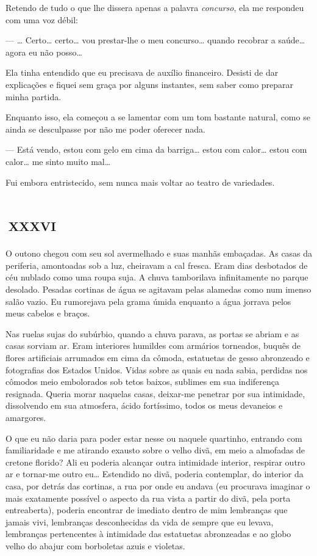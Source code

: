 Retendo de tudo o que lhe dissera apenas a palavra \textit{concurso}, ela me respondeu com uma voz débil:

--- \ldots{} Certo\ldots{} certo\ldots{} vou prestar-lhe o meu concurso\ldots{} quando recobrar a saúde\ldots{} agora eu não posso\ldots{}

Ela tinha entendido que eu precisava de auxílio financeiro. Desisti de dar explicações e fiquei sem graça por alguns instantes, sem saber como preparar minha partida.

Enquanto isso, ela começou a se lamentar com um tom bastante natural, como se ainda se desculpasse por não me poder oferecer nada.

--- Está vendo, estou com gelo em cima da barriga\ldots{} estou com calor\ldots{} estou com calor\ldots{} me sinto muito mal\ldots{}

Fui embora entristecido, sem nunca mais voltar ao teatro de variedades.


\chapter*{\small{}\,\Large\centering\textsc{xxxvi}\,\small{}}

O outono chegou com seu sol avermelhado e suas manhãs embaçadas. As casas da periferia, amontoadas sob a luz, cheiravam a cal fresca. Eram dias desbotados de céu nublado como uma roupa suja. A chuva tamborilava infinitamente no parque desolado. Pesadas cortinas de água se agitavam pelas alamedas como num imenso salão vazio. Eu rumorejava pela grama úmida enquanto a água jorrava pelos meus cabelos e braços.

Nas ruelas sujas do subúrbio, quando a chuva parava, as portas se abriam e as casas sorviam ar. Eram interiores humildes com armários torneados, buquês de flores artificiais arrumados em cima da cômoda, estatuetas de gesso abronzeado e fotografias dos Estados Unidos. Vidas sobre as quais eu nada sabia, perdidas nos cômodos meio embolorados sob tetos baixos, sublimes em sua indiferença resignada.
Queria morar naquelas casas, deixar-me penetrar por sua intimidade, dissolvendo em sua atmosfera, ácido fortíssimo, todos os meus devaneios e amargores.

O que eu não daria para poder estar nesse ou naquele quartinho, entrando com familiaridade e me atirando exausto sobre o velho divã, em meio a almofadas de cretone florido? Ali eu poderia alcançar outra intimidade interior, respirar outro ar e tornar-me outro eu\ldots{} Estendido no divã, poderia contemplar, do interior da casa, por detrás das cortinas, a rua por onde eu andava (eu procurava imaginar o mais exatamente possível o aspecto da rua vista a partir do divã, pela porta entreaberta), poderia encontrar de imediato dentro de mim lembranças que jamais vivi, lembranças desconhecidas da vida de sempre que eu levava, lembranças pertencentes à intimidade das estatuetas abronzeadas e ao globo velho do abajur com borboletas azuis e violetas.

